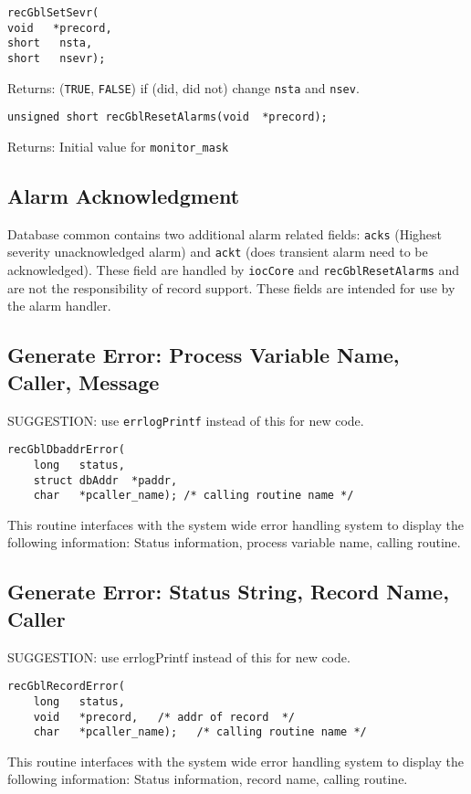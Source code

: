 \begin{verbatim}recGblSetSevr(
void   *precord,
short   nsta,
short   nsevr);
\end{verbatim}Returns: (\verb|TRUE|, \verb|FALSE|) if (did, did not) change \verb|nsta| and \verb|nsev|.

\begin{verbatim}unsigned short recGblResetAlarms(void  *precord);
\end{verbatim}Returns: Initial value for \verb|monitor_mask|

\subsection{Alarm Acknowledgment}

Database common contains two additional alarm related fields: \verb|acks| (Highest severity unacknowledged alarm) and 
\verb|ackt| (does transient alarm need to be acknowledged). These field are handled by \verb|iocCore| and \verb|recGblResetAlarms| 
and are not the responsibility of record support. These fields are intended for use by the alarm handler.

\subsection{Generate Error: Process Variable Name, Caller, Message}

SUGGESTION: use \verb|errlogPrintf| instead of this for new code.

\begin{verbatim}
recGblDbaddrError(
    long   status,
    struct dbAddr  *paddr,
    char   *pcaller_name); /* calling routine name */
\end{verbatim}This routine interfaces with the system wide error handling system to display the following information: Status 
information, process variable name, calling routine.

\subsection{Generate Error: Status String, Record Name, Caller}
SUGGESTION: use errlogPrintf instead of this for new code.
\begin{verbatim}
recGblRecordError(
    long   status,
    void   *precord,   /* addr of record  */
    char   *pcaller_name);   /* calling routine name */
\end{verbatim}
This routine interfaces with the system wide error handling system to display the following information: Status 
information, record name, calling routine.

